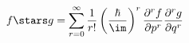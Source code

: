\begin{equation}
    \label{eq:starsexpl}
    f \stars g 
    = \sum_{r=0}^\infty \frac{1}{r!}
    \left(\frac{\hbar}{\im}\right)^r
    \frac{\partial^r f}{\partial p^r} 
    \frac{\partial^r g}{\partial q^r}
\end{equation}

